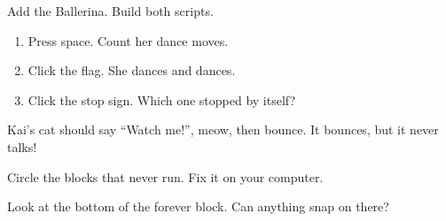 \begin{exercise}
Add the Ballerina. Build both scripts.
\begin{enumerate}[leftmargin=1.4em,itemsep=2pt]
  \item Press space. Count her dance moves.
  \item Click the flag. She dances and dances.
  \item Click the stop sign. Which one stopped by itself?
\end{enumerate}
\begin{center}
\begin{scratch}[scale=0.8]
\end{scratch}
\qquad
\begin{scratch}[scale=0.8]
\end{scratch}
\end{center}
\end{exercise}

\begin{exercise}
Kai's cat should say \enquote{Watch me!}, meow, then bounce. It bounces, but it never talks!
\begin{center}
\begin{scratch}[scale=0.8]
\end{scratch}

\vspace{0.3cm}
\begin{scratch}[scale=0.8]
\end{scratch}
\end{center}
Circle the blocks that never run. Fix it on your computer.
\end{exercise}

\begin{grownup}
Look at the bottom of the forever block. Can anything snap on there?
\end{grownup}

\begin{vocab}
\end{vocab}

